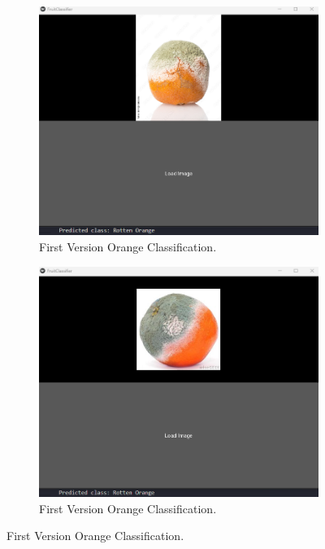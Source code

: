 \documentclass[conference]{IEEEtran}
\begin{document}
\begin{figure}[h]
\begin{subfigure}[b]{0.48\linewidth}
        \label{figFB}
    \end{subfigure}
    \hfill
    \begin{subfigure}[b]{0.48\linewidth}
        \centering
        \includegraphics[width=\linewidth]{1layer orageR1.png}
        \caption{First Version Orange Classification.}
        \label{figFA}
    \end{subfigure}
    \hfill
    \begin{subfigure}[b]{0.48\linewidth}
        \centering
        \includegraphics[width=\linewidth]{1layer orageR2.png}
        \caption{First Version Orange Classification.}

\end{subfigure}
\end{figure}
\end{document}
